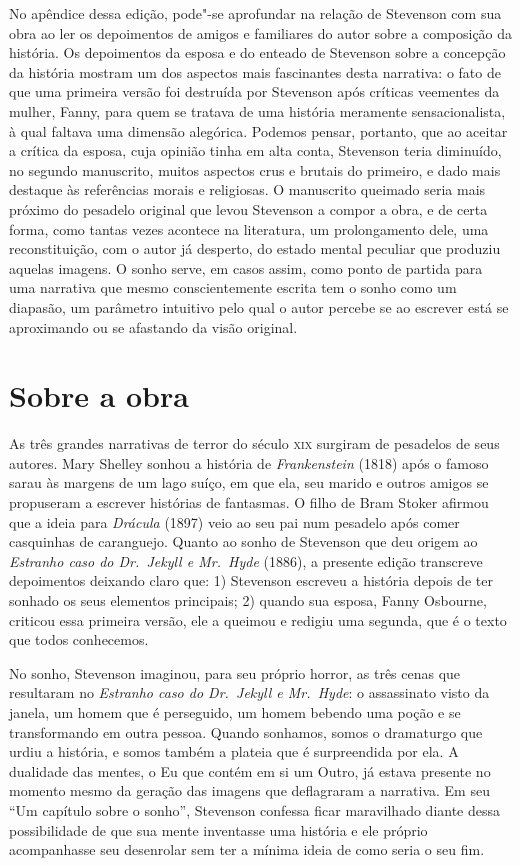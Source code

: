 No apêndice dessa edição, pode"-se aprofundar na relação de Stevenson com sua obra ao ler os depoimentos de amigos e familiares do autor sobre a composição da história.
Os depoimentos da esposa e do enteado de Stevenson sobre a concepção da
história mostram um dos aspectos mais
fascinantes desta narrativa: o fato de que uma primeira versão foi
destruída por Stevenson após críticas veementes da mulher, Fanny, para
quem se tratava de uma história meramente sensacionalista, à qual
faltava uma dimensão alegórica.  Podemos pensar, portanto, que ao
aceitar a crítica da esposa, cuja opinião tinha em alta conta,
Stevenson teria diminuído, no segundo manuscrito, muitos aspectos crus
e brutais do primeiro, e dado mais destaque às referências morais e
religiosas.  O manuscrito queimado seria mais próximo do pesadelo
original que levou Stevenson a compor a obra, e de certa forma, como tantas vezes acontece na literatura,
um prolongamento dele, uma reconstituição, com o autor já desperto, do
estado mental peculiar que produziu aquelas imagens.  O sonho serve, em
casos assim, como ponto de partida para uma narrativa que mesmo
conscientemente escrita tem o sonho como um diapasão, um parâmetro
intuitivo pelo qual o autor percebe se ao escrever está se aproximando
ou se afastando da visão original.

\pagebreak
\section{Sobre a obra}

As três grandes narrativas de terror do século \textsc{xix} surgiram de
pesadelos de seus autores.  Mary Shelley sonhou a história de
\textit{Frankenstein} (1818) após o famoso sarau às margens de um lago
suíço, em que ela, seu marido e outros amigos se propuseram a escrever
histórias de fantasmas.  O filho de Bram Stoker afirmou que a ideia
para \textit{Drácula} (1897) veio ao seu pai num pesadelo após comer
casquinhas de caranguejo.  Quanto ao sonho de Stevenson que deu origem
ao \textit{Estranho caso do Dr.~Jekyll e Mr.~Hyde} (1886), a presente
edição transcreve depoimentos deixando claro que: 1) Stevenson escreveu
a história depois de ter sonhado os seus elementos principais; 2)
quando sua esposa, Fanny Osbourne, criticou essa primeira versão, ele a       
queimou e redigiu uma segunda, que é o texto que todos conhecemos.

No sonho, Stevenson imaginou, para seu próprio horror, as três cenas que
resultaram no \textit{Estranho caso do Dr.~Jekyll e Mr.~Hyde}: o
assassinato visto da janela, um homem que é perseguido, um homem
bebendo uma poção e se transformando em outra pessoa. Quando sonhamos,
somos o dramaturgo que urdiu a história, e somos também a plateia que é
surpreendida por ela.  A dualidade das mentes, o Eu que contém em si um
Outro, já estava presente no momento mesmo da geração das imagens que
deflagraram a narrativa.  Em seu “Um capítulo sobre o sonho”, Stevenson
confessa ficar maravilhado diante dessa possibilidade de que sua mente
inventasse uma história e ele próprio acompanhasse seu desenrolar sem
ter a mínima ideia de como seria o seu fim.


